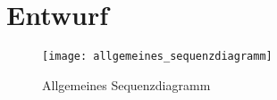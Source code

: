 \chapter{Entwurf}
\begin{figure}
\centering
\texttt{[image: allgemeines\_sequenzdiagramm]} %
\caption[Allgemeines Sequenzdiagramm]{Allgemeines Sequenzdiagramm}
\label{fig:Allgemeines Sequenzdiagramm}
\end{figure}